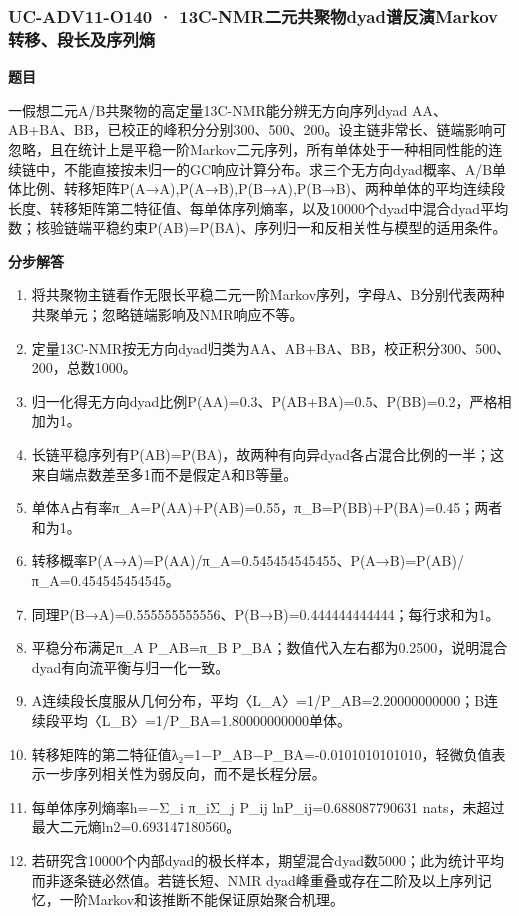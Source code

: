\documentclass[UTF8,11pt,a4paper]{ctexart}
\begin{document}
\subsubsection*{UC-ADV11-O140 · 13C-NMR二元共聚物dyad谱反演Markov转移、段长及序列熵}
\noindent\textbf{题目}\par
一假想二元A/B共聚物的高定量13C-NMR能分辨无方向序列dyad AA、AB+BA、BB，已校正的峰积分分别300、500、200。设主链非常长、链端影响可忽略，且在统计上是平稳一阶Markov二元序列，所有单体处于一种相同性能的连续链中，不能直接按未归一的GC响应计算分布。求三个无方向dyad概率、A/B单体比例、转移矩阵P(A→A),P(A→B),P(B→A),P(B→B)、两种单体的平均连续段长度、转移矩阵第二特征值、每单体序列熵率，以及10000个dyad中混合dyad平均数；核验链端平稳约束P(AB)=P(BA)、序列归一和反相关性与模型的适用条件。\par
\medskip\noindent\textbf{分步解答}
\begin{enumerate}
\item 将共聚物主链看作无限长平稳二元一阶Markov序列，字母A、B分别代表两种共聚单元；忽略链端影响及NMR响应不等。
\item 定量13C-NMR按无方向dyad归类为AA、AB+BA、BB，校正积分300、500、200，总数1000。
\item 归一化得无方向dyad比例P(AA)=0.3、P(AB+BA)=0.5、P(BB)=0.2，严格相加为1。
\item 长链平稳序列有P(AB)=P(BA)，故两种有向异dyad各占混合比例的一半；这来自端点数差至多1而不是假定A和B等量。
\item 单体A占有率π\_A=P(AA)+P(AB)=0.55，π\_B=P(BB)+P(BA)=0.45；两者和为1。
\item 转移概率P(A→A)=P(AA)/π\_A=0.545454545455、P(A→B)=P(AB)/π\_A=0.454545454545。
\item 同理P(B→A)=0.555555555556、P(B→B)=0.444444444444；每行求和为1。
\item 平稳分布满足π\_A P\_AB=π\_B P\_BA；数值代入左右都为0.2500，说明混合dyad有向流平衡与归一化一致。
\item A连续段长度服从几何分布，平均〈L\_A〉=1/P\_AB=2.20000000000；B连续段平均〈L\_B〉=1/P\_BA=1.80000000000单体。
\item 转移矩阵的第二特征值λ₂=1−P\_AB−P\_BA=-0.0101010101010，轻微负值表示一步序列相关性为弱反向，而不是长程分层。
\item 每单体序列熵率h=−Σ\_i π\_iΣ\_j P\_ij lnP\_ij=0.688087790631 nats，未超过最大二元熵ln2=0.693147180560。
\item 若研究含10000个内部dyad的极长样本，期望混合dyad数5000；此为统计平均而非逐条链必然值。若链长短、NMR dyad峰重叠或存在二阶及以上序列记忆，一阶Markov和该推断不能保证原始聚合机理。
\end{enumerate}
\end{document}
